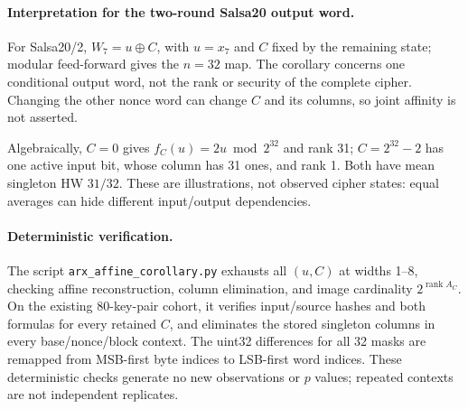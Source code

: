 \paragraph{Interpretation for the two-round Salsa20 output word.}

For Salsa20/2, $W_7=u\oplus C$, with $u=x_7$ and $C$ fixed by the remaining state; modular feed-forward gives the $n=32$ map. The corollary concerns one conditional output word, not the rank or security of the complete cipher. Changing the other nonce word can change $C$ and its columns, so joint affinity is not asserted.

Algebraically, $C=0$ gives $f_C(u)=2u\bmod2^{32}$ and rank 31; $C=2^{32}-2$ has one active input bit, whose column has 31 ones, and rank 1. Both have mean singleton HW $31/32$. These are illustrations, not observed cipher states: equal averages can hide different input/output dependencies.

\paragraph{Deterministic verification.}

The script \texttt{arx\_affine\_corollary.py} exhausts all $(u,C)$ at widths 1--8, checking affine reconstruction, column elimination, and image cardinality $2^{\operatorname{rank}A_C}$. On the existing 80-key-pair cohort, it verifies input/source hashes and both formulas for every retained $C$, and eliminates the stored singleton columns in every base/nonce/block context. The uint32 differences for all 32 masks are remapped from MSB-first byte indices to LSB-first word indices. These deterministic checks generate no new observations or $p$ values; repeated contexts are not independent replicates.
